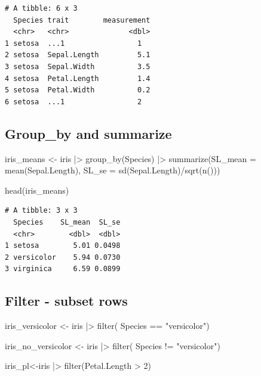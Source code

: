 \documentclass[
  letterpaper,
  DIV=11,
  numbers=noendperiod,
  oneside]{scrartcl}
\newenvironment{Shaded}{\begin{snugshade}}{\end{snugshade}}
\newcommand{\AttributeTok}[1]{\textcolor[rgb]{0.40,0.45,0.13}{#1}}
\newcommand{\DecValTok}[1]{\textcolor[rgb]{0.68,0.00,0.00}{#1}}
\newcommand{\FunctionTok}[1]{\textcolor[rgb]{0.28,0.35,0.67}{#1}}
\newcommand{\NormalTok}[1]{\textcolor[rgb]{0.00,0.23,0.31}{#1}}
\newcommand{\OtherTok}[1]{\textcolor[rgb]{0.00,0.23,0.31}{#1}}
\newcommand{\SpecialCharTok}[1]{\textcolor[rgb]{0.37,0.37,0.37}{#1}}
\newcommand{\StringTok}[1]{\textcolor[rgb]{0.13,0.47,0.30}{#1}}
\begin{document}
\begin{verbatim}
# A tibble: 6 x 3
  Species trait        measurement
  <chr>   <chr>              <dbl>
1 setosa  ...1                 1  
2 setosa  Sepal.Length         5.1
3 setosa  Sepal.Width          3.5
4 setosa  Petal.Length         1.4
5 setosa  Petal.Width          0.2
6 setosa  ...1                 2  
\end{verbatim}

\subsection{Group\_by and summarize}\label{group_by-and-summarize}

\begin{Shaded}
\begin{Highlighting}[]
\NormalTok{iris\_means }\OtherTok{\textless{}{-}}\NormalTok{ iris }\SpecialCharTok{|\textgreater{}} 
  \FunctionTok{group\_by}\NormalTok{(Species) }\SpecialCharTok{|\textgreater{}} 
  \FunctionTok{summarize}\NormalTok{(}\AttributeTok{SL\_mean =} \FunctionTok{mean}\NormalTok{(Sepal.Length),}
            \AttributeTok{SL\_se =} \FunctionTok{sd}\NormalTok{(Sepal.Length)}\SpecialCharTok{/}\FunctionTok{sqrt}\NormalTok{(}\FunctionTok{n}\NormalTok{()))}

\FunctionTok{head}\NormalTok{(iris\_means)}
\end{Highlighting}
\end{Shaded}

\begin{verbatim}
# A tibble: 3 x 3
  Species    SL_mean  SL_se
  <chr>        <dbl>  <dbl>
1 setosa        5.01 0.0498
2 versicolor    5.94 0.0730
3 virginica     6.59 0.0899
\end{verbatim}

\subsection{Filter - subset rows}\label{filter---subset-rows}

\begin{Shaded}
\begin{Highlighting}[]
\NormalTok{iris\_versicolor }\OtherTok{\textless{}{-}}\NormalTok{ iris }\SpecialCharTok{|\textgreater{}}  \FunctionTok{filter}\NormalTok{( Species }\SpecialCharTok{==} \StringTok{"versicolor"}\NormalTok{)}

\NormalTok{iris\_no\_versicolor }\OtherTok{\textless{}{-}}\NormalTok{ iris }\SpecialCharTok{|\textgreater{}}  \FunctionTok{filter}\NormalTok{( Species }\SpecialCharTok{!=} \StringTok{"versicolor"}\NormalTok{)}

\NormalTok{iris\_pl}\OtherTok{\textless{}{-}}\NormalTok{iris }\SpecialCharTok{|\textgreater{}}  \FunctionTok{filter}\NormalTok{(Petal.Length }\SpecialCharTok{\textgreater{}} \DecValTok{2}\NormalTok{)}
\end{Highlighting}
\end{Shaded}
\end{document}
